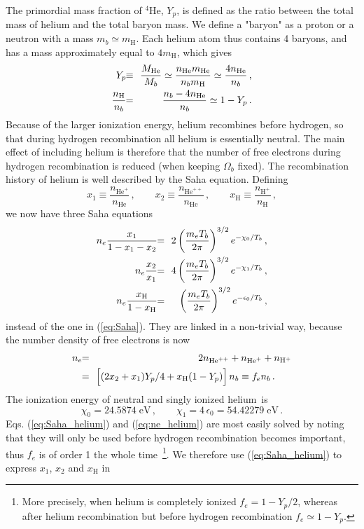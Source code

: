 \documentclass[twocolumn,nofootinbib,amsmath,amssymb]{revtex4}
\newcommand{\be}{\begin{equation}}
\newcommand{\ee}{\end{equation}}
\newcommand{\ba}{\begin{eqnarray}}
\newcommand{\ea}{\end{eqnarray}}
\newcommand{\hs}{\hspace{-1.12mm}}
\newcommand{\eq}{\hs & = & \hs}
\newcommand{\eqequiv}{\hs & \equiv & \hs}
\newcommand{\addspace}[2][3mm]{\raisebox{0mm}[#1][#1]{$\displaystyle #2$}}
\newcommand{\addsmsp}[1]{\addspace[2mm]{#1}}
\newcommand{\hydr}{\mathrm{H}}
\newcommand{\he}{\mathrm{He}}
\newcommand{\ev}{\mathrm{eV}}
\begin{document}
The primordial mass fraction of $^4 \he$, $Y_p$, is defined as the ratio
between the total mass of helium and the total baryon mass. We define a
"baryon" as a proton or a neutron with a mass $m_b \simeq m_\hydr$. Each helium
atom thus contains 4 baryons, and has a mass approximately equal to $4
m_\hydr$, which gives~\cite{Trotta_Hansen}
\ba
  Y_p \eqequiv \frac{M_\he}{M_b} \simeq
    \frac{n_\he m_\he}{n_b m_\hydr} \simeq
    \frac{4 n_\he}{n_b} \, , \nonumber \\
  \frac{n_\hydr}{n_b} \eq
    \frac{n_b - 4 n_\he}{n_b} \simeq 1 - Y_p \, .
\ea
Because of the larger ionization energy, helium recombines before hydrogen, so
that during hydrogen recombination all helium is essentially neutral. The main
effect of including helium is therefore that the number of free electrons
during hydrogen recombination is reduced (when keeping $\Omega_b$ fixed). The
recombination history of helium is well described by the Saha equation.
Defining
\be
  x_1 \equiv \frac{n_{\he^+}}{n_\he} \, , \qquad
  x_2 \equiv \frac{n_{\he^{++}}}{n_\he} \, , \qquad
  x_\hydr \equiv \frac{n_{\hydr^+}}{n_\hydr} \, ,
\ee
we now have three Saha equations~\cite{Ma_Bert}
\ba
  n_e \frac{x_1}{1-x_1-x_2} \eq
    2 \left( \frac{m_e T_b}{2\pi} \right)^{3/2} e^{-\chi_0/T_b} \, ,
    \nonumber \\
  n_e \frac{x_2}{x_1} \eq
    4 \left( \frac{m_e T_b}{2\pi} \right)^{3/2} e^{-\chi_1/T_b} \, ,
    \nonumber \\
  n_e \frac{x_\hydr}{1-x_\hydr} \eq
    \left( \frac{m_e T_b}{2\pi} \right)^{3/2} e^{-\epsilon_0/T_b} \, ,
  \label{eq:Saha_helium}
\ea
instead of the one in (\ref{eq:Saha}). They are linked in a non-trivial way,
because the number density of free electrons is now
\ba
  n_e \eq 2 n_{\he^{++}} + n_{\he^+} + n_{\hydr^+}
    \nonumber \\
  \eq \left[ \addsmsp{(2x_2+x_1) Y_p/4 + x_\hydr (1-Y_p)} \right] n_b
    \equiv f_e n_b \, . \hspace{6mm}
  \label{eq:ne_helium}
\ea
The ionization energy of neutral and singly ionized helium~is
\be
  \chi_0 = 24.5874 \;\ev \, , \qquad
  \chi_1 = 4 \,\epsilon_0 = 54.42279 \;\ev \, .
\ee
Eqs. (\ref{eq:Saha_helium}) and (\ref{eq:ne_helium}) are most easily solved by
noting that they will only be used before hydrogen recombination becomes
important, thus $f_e$ is of order 1 the whole time~\footnote{More precisely,
when helium is completely ionized $f_e = 1 - Y_p/2$, whereas after helium
recombination but before hydrogen recombination $f_e \simeq 1 - Y_p$.}. We
therefore use (\ref{eq:Saha_helium}) to express $x_1$, $x_2$ and $x_\hydr$ in
\end{document}
